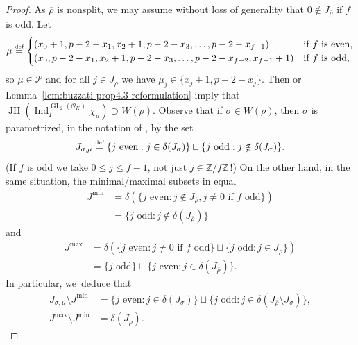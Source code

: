 \documentclass[JEP,XML,SOM,Unicode,NoFloatCountersInSection, NoEqCountersInSection,published]{cedram}
\newcommand{\defeq}{\stackrel{\textrm{\tiny{\upshape{def}}}}{=}}
\newcommand{\Z}{{\mathbb Z}}
\newcommand{\cO}{\mathcal{O}}
\renewcommand{\P}{\mathscr P}
\newcommand{\brho}{\overline{\rho}}
\DeclareMathOperator{\GL}{GL}
\DeclareMathOperator{\Ind}{Ind}
\DeclareMathOperator{\JH}{\mathrm{JH}}
\theoremstyle{plain}
\theoremstyle{definition}
\begin{document}
\begin{proof}
As $\brho$ is nonsplit, we may assume without loss of generality that $0 \notin J_{\brho}$ if $f$ is odd.
Let
\begin{equation*}
\mu \defeq
\begin{cases}
(x_0+1,p-2-x_1,x_2+1,p-2-x_3,\dots,p-2-x_{f-1}) & \text{if $f$ is even},\\
(x_0,p-2-x_1,x_2+1,p-2-x_3,\dots,p-2-x_{f-2},x_{f-1}+1) & \text{if $f$ is odd},
\end{cases}
\end{equation*}
so $\mu \in \P$ and for all $j \in J_{\brho}$ we have $\mu_j \in \{x_j+1,p-2-x_j\}$.
Then \cite[Prop.\,4.3]{breuil-buzzati} or Lemma~\ref{lem:buzzati-prop4.3-reformulation} imply that $\JH(\Ind_I^{\GL_2(\cO_K)} \chi_\mu) \supset W(\brho)$.
Observe that if $\sigma \in W(\brho)$, then $\sigma$ is parametrized, in the notation of \cite{breuil-buzzati}, by the set
\begin{equation*}
J_{\sigma,\mu} \defeq \{ \text{$j$ even}: j \in \delta(J_\sigma) \} \sqcup \{ \text{$j$ odd}: j\notin \delta(J_\sigma) \}.
\end{equation*}
(If $f$ is odd we take $0 \le j \le f-1$, not just $j \in \Z/f\Z$\,!)
On the other hand, in the same situation, the minimal/maximal subsets in \cite[Prop.\,4.3]{breuil-buzzati} equal
\begin{align*}
J^{\min} &= \delta(\{ \text{$j$ even}: j\notin J_{\brho}, \text{$j \ne 0$ if $f$ odd} \}) \\
&= \{ \text{$j$ odd}: j\notin \delta(J_{\brho}) \}
\end{align*}
and
\begin{align*}
J^{\max} &= \delta(\{ \text{$j$ even}: \text{$j \ne 0$ if $f$ odd} \} \sqcup \{ \text{$j$ odd}: j\in J_{\brho} \}) \\
&= \{ \text{$j$ odd} \} \sqcup \{ \text{$j$ even}: j\in \delta(J_{\brho}) \}.
\end{align*}
In particular, we~deduce that
\begin{equation}\label{eq:Jsigma-mu}
\begin{aligned}
J_{\sigma,\mu} \setminus J^{\min} &= \{ \text{$j$ even}: j \in \delta(J_\sigma) \} \sqcup \{ \text{$j$ odd}: j\in \delta(J_{\brho} \setminus J_\sigma) \},\\
J^{\max} \setminus J^{\min} &= \delta(J_{\brho}).
\end{aligned}
\end{equation}


\end{proof}
\end{document}
